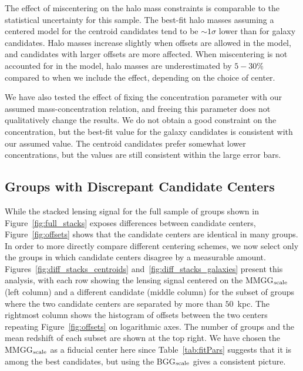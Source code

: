 \documentclass[12pt]{emulateapj}
\begin{document}
The effect of miscentering on the halo mass constraints is comparable
to the statistical uncertainty for this sample. The best-fit halo
masses assuming a centered model for the centroid candidates tend to
be $\sim1\sigma$ lower than for galaxy candidates. Halo masses
increase slightly when offsets are allowed in the model, and
candidates with larger offsets are more affected. When miscentering is
not accounted for in the model, halo masses are underestimated by
$5-30\%$ compared to when we include the effect, depending on the
choice of center.

We have also tested the effect of fixing the concentration parameter
with our assumed mass-concentration relation, and freeing this
parameter does not qualitatively change the results. We do not obtain
a good constraint on the concentration, but the best-fit value for the
galaxy candidates is consistent with our assumed value. The centroid
candidates prefer somewhat lower concentrations, but the values are
still consistent within the large error bars.

\subsection{Groups with Discrepant Candidate Centers}
\label{s:discrepant}

 While the stacked lensing signal for the full sample of groups shown
in Figure~\ref{fig:full_stacks} exposes differences between candidate
centers, Figure~\ref{fig:offsets} shows that the candidate centers are
identical in many groups. In order to more directly compare different
centering schemes, we now select only the groups in which candidate
centers disagree by a measurable amount. Figures~\ref{fig:diff_stacks_centroids}
and~\ref{fig:diff_stacks_galaxies} present this analysis, with 
each row showing the lensing signal centered on the MMGG$_{\rm scale}$
(left column) and a different candidate (middle column) for the subset
of groups where the two candidate centers are separated by more than
$50$~{\rm kpc}. The rightmost column shows the histogram of offsets
between the two centers repeating Figure~\ref{fig:offsets} on
logarithmic axes. The number of groups and the mean redshift
of each subset are shown at the top right. We have
  chosen the MMGG$_{\rm scale}$ as a fiducial center here since
  Table~\ref{tab:fitPars} suggests that it is among the best
  candidates, but using the BGG$_{\rm scale}$ gives a consistent
  picture.
\end{document}
